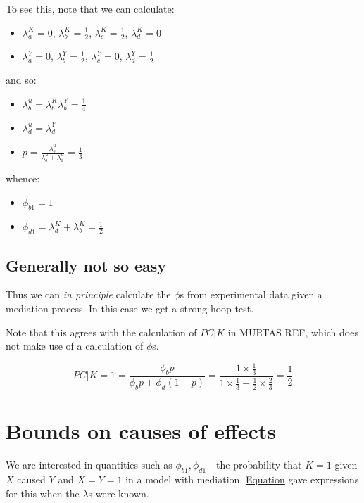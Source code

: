 \documentclass[12pt,]{book}
\providecommand{\tightlist}{%
  \setlength{\itemsep}{0pt}\setlength{\parskip}{0pt}}
\begin{document}
To see this, note that we can calculate:

\begin{itemize}
\tightlist
\item
  \(\lambda_a^K =0\), \(\lambda_b^K = \frac{1}{2}\), \(\lambda_c^K = \frac{1}{2}\), \(\lambda_d^K = 0\)
\item
  \(\lambda_a^Y =0\), \(\lambda_b^Y=\frac{1}{2}\), \(\lambda_c^Y=0\), \(\lambda_d^Y=\frac{1}{2}\)
\end{itemize}

and so:

\begin{itemize}
\tightlist
\item
  \(\lambda_b^u = \lambda_b^K\lambda_b^Y = \frac{1}4\)
\item
  \(\lambda_d^u = \lambda_d^Y\)
\item
  \(p = \frac{\lambda_b^u}{\lambda_b^u + \lambda_d^u} = \frac{1}3\).
\end{itemize}

whence:

\begin{itemize}
\tightlist
\item
  \(\phi_{b1} = 1\)
\item
  \(\phi_{d1} = \lambda_d^K + \lambda_b^K = \frac{1}{2}\)
\end{itemize}

\hypertarget{generally-not-so-easy}{%
\subsection{Generally not so easy}\label{generally-not-so-easy}}

Thus we can \emph{in principle} calculate the \(\phi\)s from experimental data given a mediation process. In this case we get a strong hoop test.

Note that this agrees with the calculation of \(PC|K\) in MURTAS REF, which does not make use of a calculation of \(\phi\)s.

\[PC | K = 1 = \frac{\phi_b p}{\phi_b p + \phi_d (1-p)} = \frac{1 \times\frac13}{1 \times\frac13 + \frac{1}{2} \times \frac23}  = \frac{1}{2}\]

\hypertarget{bounds-on-causes-of-effects}{%
\section{Bounds on causes of effects}\label{bounds-on-causes-of-effects}}

We are interested in quantities such as \(\phi_{b1}, \phi_{d1}\)---the probability that \(K=1\) given \(X\) caused \(Y\) and \(X=Y=1\) in a model with mediation. \protect\hyperlink{eq:phis_from_lambdas}{Equation} gave expressions for this when the \(\lambda\)s were known.
\end{document}
